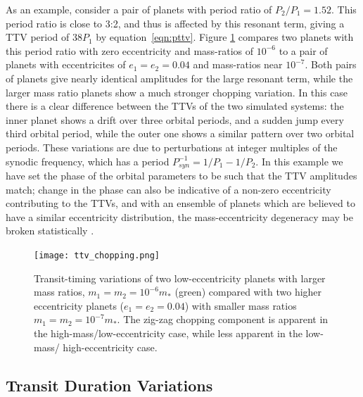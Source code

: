 \documentclass[graybox,natbib,nosecnum]{svmult}
\begin{document}
As an example, consider a pair of planets with period ratio of $P_2/P_1 = 1.52$.  This period ratio
is close to 3:2, and thus is affected by this resonant term, giving a TTV period of $38 P_1$ by equation~\ref{eqn:pttv}.
Figure \ref{ttv_chopping} compares two planets with this period ratio with zero eccentricity
and mass-ratios of $10^{-6}$ to a pair of planets with eccentricites of $e_1=e_2=0.04$
and mass-ratios near $10^{-7}$.  Both pairs of planets give nearly identical amplitudes
for the large resonant term, while the larger mass ratio planets show a much stronger chopping
variation.  In this case there is a clear difference between the TTVs of the two simulated
systems:  the inner planet shows a drift over three orbital periods, and a sudden jump
every third orbital period, while the outer one shows a similar pattern over two orbital
periods.  These variations are due to perturbations at integer multiples of the synodic
frequency, which has a period $P_{syn}^{-1} = 1/P_1-1/P_2$.  In this example we have
set the phase of the orbital parameters to be such that the TTV amplitudes match;  change
in the phase can also be indicative of a non-zero eccentricity contributing to the TTVs,
and with an ensemble of planets which are believed to have a similar eccentricity
distribution, the mass-eccentricity degeneracy may be broken statistically \citep{2012ApJ...761..122L,
2014ApJ...787...80H}.

\begin{figure}
\centerline{
\texttt{[image: ttv\_chopping.png]}}
%
\caption{Transit-timing variations of two low-eccentricity planets with larger
mass ratios, $m_1 = m_2 = 10^{-6} m_*$ (green) compared with two higher eccentricity planets ($e_1=e_2=0.04$)
with smaller mass ratios $m_1 = m_2 = 10^{-7} m_*$.  The zig-zag chopping component
is apparent in the high-mass/low-eccentricity case, while less apparent in the low-mass/
high-eccentricity case.}
\label{ttv_chopping}       %
\end{figure}




\subsection{Transit Duration Variations}
\end{document}
